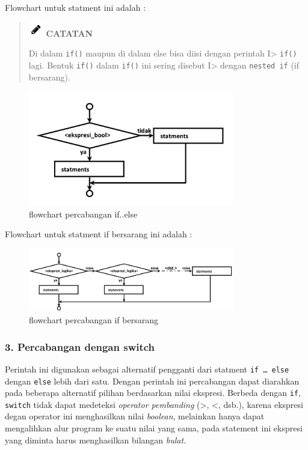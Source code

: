 Flowchart untuk statment ini adalah :

\begin{quotation}
\includegraphics{images/pencil}	\textbf{CATATAN} 
	
	Di
	dalam \texttt{if()} maupun di dalam else bisa diisi dengan perintah
	I\textgreater{} \texttt{if()} lagi. Bentuk \texttt{if()} dalam
	\texttt{if()} ini sering disebut I\textgreater{} dengan
	\texttt{nested\ if} (if bersarang).
\end{quotation}


\begin{figure}[htbp]
\centering
\includegraphics[width=0.8\textwidth]{images/capture2-2.png}
\caption{flowchart percabangan if..else}
\end{figure}

Flowchart untuk statment if bersarang ini adalah :

\begin{figure}[htbp]
\centering
\includegraphics[width=0.8\textwidth]{images/capture2-1.png}
\caption{flowchart percabangan if bersarang}
\end{figure}

\subsubsection{3. Percabangan dengan
switch}\label{percabangan-dengan-switch}

Perintah ini digunakan sebagai alternatif pengganti dari statment
\texttt{if\ \ldots{}\ else} dengan \texttt{else} lebih dari satu. Dengan
perintah ini percabangan dapat diarahkan pada beberapa alternatif
pilihan berdasarkan nilai ekspresi. Berbeda dengan \texttt{if},
\texttt{switch} tidak dapat medeteksi \emph{operator pembanding}
(\textgreater{}, \textless{}, dsb.), karena ekspresi degan operator ini
menghasilkan nilai \emph{boolean}, melainkan hanya dapat mengalihkan
alur program ke suatu nilai yang sama, pada statement ini ekspresi yang
diminta harus menghasilkan bilangan \emph{bulat}.

